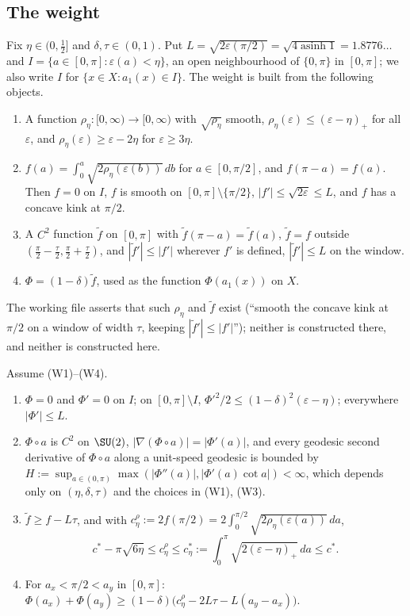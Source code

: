 \subsection{The weight}\label{tu:U-sec-weight}
Fix $\eta\in(0,\frac12]$ and $\delta,\tau\in(0,1)$. Put $L=\sqrt{2\varepsilon(\pi/2)}=\sqrt{4\operatorname{asinh}1}=1.8776\ldots$ and
$I=\{a\in[0,\pi]:\varepsilon(a)<\eta\}$, an open neighbourhood of $\{0,\pi\}$ in $[0,\pi]$; we also write $I$ for
$\{x\in X:a_1(x)\in I\}$. The weight is built from the following objects.
\begin{enumerate}
\item[(W1)] A function $\rho_\eta:[0,\infty)\to[0,\infty)$ with $\sqrt{\rho_\eta}$ smooth, $\rho_\eta(\varepsilon)\le(\varepsilon-\eta)_+$ for
all $\varepsilon$, and $\rho_\eta(\varepsilon)\ge\varepsilon-2\eta$ for $\varepsilon\ge3\eta$.
\item[(W2)] $f(a)=\int_0^a\sqrt{2\rho_\eta(\varepsilon(b))}\,db$ for $a\in[0,\pi/2]$, and $f(\pi-a)=f(a)$. Then $f=0$ on $I$,
$f$ is smooth on $[0,\pi]\setminus\{\pi/2\}$, $|f'|\le\sqrt{2\varepsilon}\le L$, and $f$ has a concave kink at $\pi/2$.
\item[(W3)] A $C^2$ function $\tilde f$ on $[0,\pi]$ with $\tilde f(\pi-a)=\tilde f(a)$, $\tilde f=f$ outside
$(\frac\pi2-\frac\tau2,\frac\pi2+\frac\tau2)$, and $|\tilde f'|\le|f'|$ wherever $f'$ is defined, $|\tilde f'|\le L$ on the window.
\item[(W4)] $\Phi=(1-\delta)\tilde f$, used as the function $\Phi(a_1(x))$ on $X$.
\end{enumerate}
The working file asserts that such $\rho_\eta$ and $\tilde f$ exist (``smooth the concave kink at $\pi/2$ on a window of
width $\tau$, keeping $|\tilde f'|\le|f'|$''); neither is constructed there, and neither is constructed here.

\begin{lemma}\label{tu:U-weight}
Assume (W1)--(W4).
\begin{enumerate}
\item $\Phi=0$ and $\Phi'=0$ on $I$; on $[0,\pi]\setminus I$,
$\Phi'^2/2\le(1-\delta)^2(\varepsilon-\eta)$; everywhere $|\Phi'|\le L$.
\item $\Phi\circ a$ is $C^2$ on $\SU(2)$, $|\nabla(\Phi\circ a)|=|\Phi'(a)|$, and every geodesic second derivative of
$\Phi\circ a$ along a unit-speed geodesic is bounded by $H:=\sup_{a\in(0,\pi)}\max(|\Phi''(a)|,|\Phi'(a)\cot a|)<\infty$, which
depends only on $(\eta,\delta,\tau)$ and the choices in (W1), (W3).
\item $\tilde f\ge f-L\tau$, and with $c^\rho_\eta:=2f(\pi/2)=2\int_0^{\pi/2}\sqrt{2\rho_\eta(\varepsilon(a))}\,da$,
\[
c^*-\pi\sqrt{6\eta}\le c^\rho_\eta\le c^*_\eta:=\int_0^\pi\sqrt{2(\varepsilon-\eta)_+}\,da\le c^* .
\]
\item For $a_x<\pi/2<a_y$ in $[0,\pi]$: $\Phi(a_x)+\Phi(a_y)\ge(1-\delta)\bigl(c^\rho_\eta-2L\tau-L(a_y-a_x)\bigr)$.
\end{enumerate}
\end{lemma}


